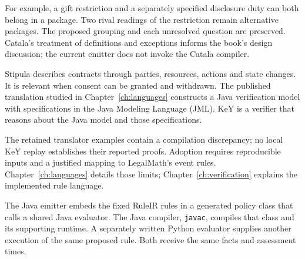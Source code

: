 \documentclass[12pt,a4paper,oneside,openany]{book}
\begin{document}
For example, a gift restriction and a separately specified disclosure duty can
both belong in a package. Two rival readings of the restriction remain
alternative packages. The proposed grouping and each unresolved question are
preserved. Catala's treatment of definitions and exceptions informs the book's
design discussion; the current emitter does not invoke the Catala compiler.

Stipula describes contracts through parties, resources, actions and state
changes. It is relevant when consent can be granted and withdrawn. The
published translation studied in Chapter~\ref{ch:languages} constructs a Java
verification model with specifications in the Java Modeling Language (JML).
KeY is a verifier that reasons about the Java model and those specifications.

\begin{MapDiagram}
\end{MapDiagram}

The retained translator examples contain a compilation discrepancy; no local
KeY replay establishes their reported proofs. Adoption requires reproducible
inputs and a justified mapping to LegalMath's event rules.
Chapter~\ref{ch:languages} details those limits; Chapter~\ref{ch:verification}
explains the implemented rule language.

\clearpage
{}
The Java emitter embeds the fixed RuleIR rules in a generated policy class
that calls a shared Java evaluator. The Java compiler, \texttt{javac}, compiles
that class and its supporting runtime. A separately written Python evaluator
supplies another execution of the same proposed rule. Both receive the same
facts and assessment times.
\end{document}
